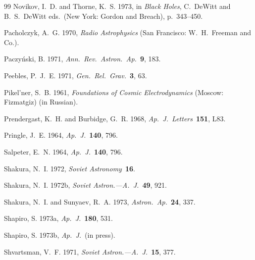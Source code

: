 \begin{thebibliography}{99}
Novikov, I.~D. and Thorne, K.~S. 1973, in \textit{Black Holes}, C.~DeWitt and B.~S.~DeWitt eds.\
(New York: Gordon and Breach), p.~343--450.

Pacholczyk, A.~G. 1970, \textit{Radio Astrophysics} (San Francisco: W.~H.~Freeman and Co.).

Paczy\'nski, B. 1971, \textit{Ann.\ Rev.\ Astron.\ Ap.}\ \textbf{9}, 183.

Peebles, P.~J.~E. 1971, \textit{Gen.\ Rel.\ Grav.}\ \textbf{3}, 63.

Pikel'ner, S.~B. 1961, \textit{Foundations of Cosmic Electrodynamics} (Moscow: Fizmatgiz) (in
Russian).

Prendergast, K.~H. and Burbidge, G.~R. 1968, \textit{Ap.\ J.\ Letters}\ \textbf{151}, L83.

Pringle, J.~E. 1964, \textit{Ap.\ J.}\ \textbf{140}, 796.

Salpeter, E.~N. 1964, \textit{Ap.\ J.}\ \textbf{140}, 796.

Shakura, N.~I. 1972, \textit{Soviet Astronomy}\ \textbf{16}.

Shakura, N.~I. 1972b, \textit{Soviet Astron.---A.~J.}\ \textbf{49}, 921.

Shakura, N.~I. and Sunyaev, R.~A. 1973, \textit{Astron.\ Ap.}\ \textbf{24}, 337.

Shapiro, S. 1973a, \textit{Ap.\ J.}\ \textbf{180}, 531.

Shapiro, S. 1973b, \textit{Ap.\ J.}\ (in press).

Shvartsman, V.~F. 1971, \textit{Soviet Astron.---A.~J.}\ \textbf{15}, 377.

\end{thebibliography}
